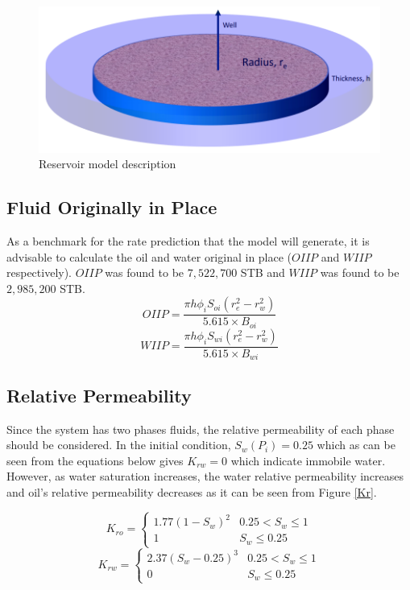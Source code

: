 \documentclass[12pt,letterpaper,titlepage]{article}
\begin{document}
\begin{figure}[h]
\centering
\includegraphics[width=.8\textwidth]{Capture.png}
\caption{\label{fig:1}Reservoir model description}
\end{figure}

\subsection{Fluid Originally in Place}
As a benchmark for the rate prediction that the model will generate, it is advisable to calculate the oil and water original in place ($OIIP$ and $WIIP$ respectively). $OIIP$ was found to be $7,522,700$ STB and $WIIP$ was found to be $2,985,200$ STB.
\begin{equation}
OIIP = \frac{\pi h \phi_i S_{oi}(r_e^2-r_w^2)}{5.615\times B_{oi}}
\end{equation}
\begin{equation}
WIIP = \frac{\pi h \phi_i S_{wi}(r_e^2-r_w^2)}{5.615\times B_{wi}}
\end{equation}

\subsection{Relative Permeability}
Since the system has two phases fluids, the relative permeability of each phase should be considered. In the initial condition, $S_w(P_i)=0.25$ which as can be seen from the equations below gives $K_{rw}=0$ which indicate immobile water. However, as water saturation increases, the water relative permeability increases and oil's relative permeability decreases as it can be seen from Figure \ref{Kr}.

\begin{equation}
K_{ro}=
\left\{
		\begin{array} {ll}
        	1.77(1-S_w)^2 & 0.25<S_w \leq 1 \\
            1			& S_w \leq 0.25
         \end{array}
\right.         
\end{equation}
\begin{equation}
K_{rw}=
\left\{
		\begin{array} {ll}
        	2.37(S_w-0.25)^3 & 0.25<S_w \leq 1 \\
            0			& S_w \leq 0.25
         \end{array}
\right.         
\end{equation}
\end{document}
